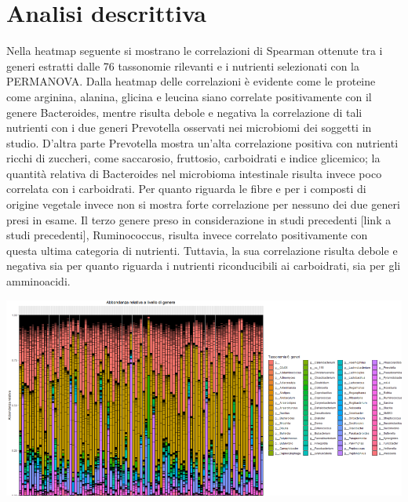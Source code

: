 \section{Analisi descrittiva}
Nella heatmap seguente si mostrano le correlazioni di Spearman ottenute tra i generi estratti dalle 76 tassonomie rilevanti e i nutrienti selezionati con la PERMANOVA. 
Dalla heatmap delle correlazioni è evidente come le proteine come arginina, alanina, glicina e leucina siano correlate positivamente con il genere Bacteroides, mentre risulta debole e negativa la correlazione di tali nutrienti con i due generi Prevotella osservati nei microbiomi dei soggetti in studio. D’altra parte Prevotella mostra un'alta correlazione positiva con nutrienti ricchi di zuccheri, come saccarosio, fruttosio, carboidrati e indice glicemico; la quantità relativa di Bacteroides nel microbioma intestinale risulta invece poco correlata con i carboidrati. Per quanto riguarda le fibre e per i composti di origine vegetale invece non si mostra forte correlazione per nessuno dei due generi presi in esame. Il terzo genere preso in considerazione in studi precedenti [link a studi precedenti], Ruminococcus, risulta invece correlato positivamente con questa ultima categoria di nutrienti. Tuttavia, la sua correlazione risulta debole e negativa sia per quanto riguarda i nutrienti riconducibili ai carboidrati, sia per gli amminoacidi.
\vspace*{1cm}
\begin{Figure}
    \centering
    \includegraphics[width=\linewidth,keepaspectratio]{images/abbondanza-generi.png}
  \end{Figure}
 \vspace*{1cm}

